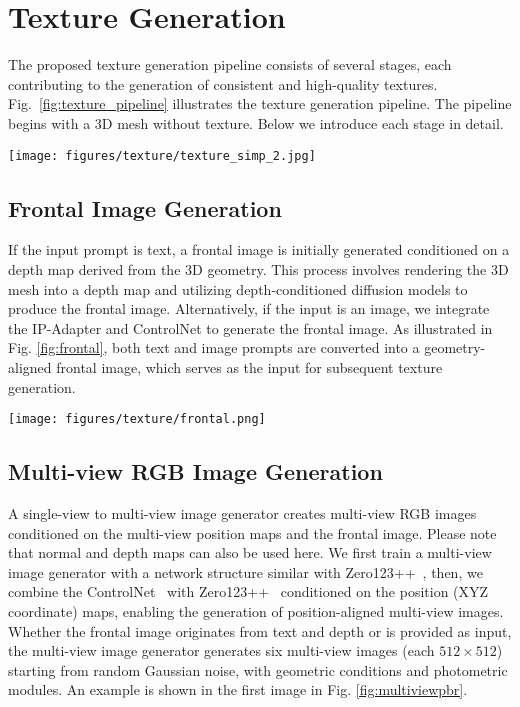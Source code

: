 \section{Texture Generation}
\label{sec:texture}
The proposed texture generation pipeline consists of several stages, each contributing to the generation of consistent and high-quality textures. Fig.~\ref{fig:texture_pipeline} illustrates the texture generation pipeline. The pipeline begins with a 3D mesh without texture. Below we introduce each stage in detail.

\begin{figure*}
    \centering 
    \texttt{[image: figures/texture/texture\_simp\_2.jpg]}
    \caption[Texture Generation Pipeline]
    {Texture Generation Pipeline (input image and mesh from Trellis3D). }
    \label{fig:texture_pipeline}
\end{figure*}

\subsection{Frontal Image Generation} %
If the input prompt is text, a frontal image is initially generated conditioned on a depth map derived from the 3D geometry. This process involves rendering the 3D mesh into a depth map and utilizing depth-conditioned diffusion models \cite{zhang2023adding} to produce the frontal image. Alternatively, if the input is an image, we integrate the IP-Adapter \cite{ye2023ip} and ControlNet \cite{zhang2023adding} to generate the frontal image. As illustrated in Fig. \ref{fig:frontal}, both text and image prompts are converted into a geometry-aligned frontal image, which serves as the input for subsequent texture generation. 

\begin{figure*}
    \centering 
    \texttt{[image: figures/texture/frontal.png]}
    \caption[Frontal Image Generation.]
    {Both textual and visual prompts are transformed into a frontal image that is aligned with the frontal-view geometry.}
    \label{fig:frontal}
\end{figure*}


\subsection{Multi-view RGB Image Generation} %
\label{sec:texture:multiview}
A single-view to multi-view image generator creates multi-view RGB images conditioned on the multi-view position maps and the frontal image. Please note that normal and depth maps can also be used here. We first train a multi-view image generator with a network structure similar with Zero123++~\cite{shi2023zero123++}, then, we combine the ControlNet~\cite{zhang2023adding} with Zero123++~\cite{shi2023zero123++} conditioned on the position (XYZ coordinate) maps, enabling the generation of position-aligned multi-view images. Whether the frontal image originates from text and depth or is provided as input, the multi-view image generator generates six multi-view images (each $512 \times 512$) starting from random Gaussian noise, with geometric conditions and photometric modules. An example is shown in the first image in Fig. \ref{fig:multiviewpbr}.

